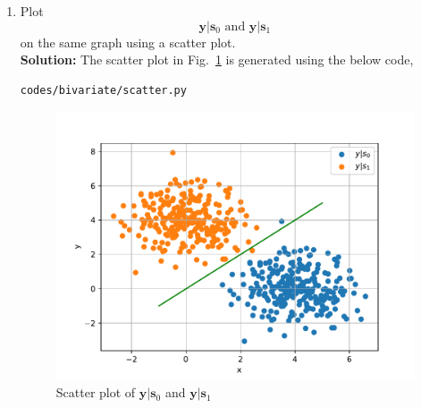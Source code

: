 \documentclass[journal,8pt,onecolumn]{IEEEtran}
\newcommand\figref{Fig.~\ref}
\providecommand{\mbf}{\mathbf}
\newcommand{\solution}{\noindent \textbf{Solution: }}
\begin{document}
\begin{enumerate}
\item
\label{ch5_fsk}
Plot 
%
\begin{equation}
\mbf{y}|\mbf{s}_0 \text{ and } \mbf{y}|\mbf{s}_1
\end{equation}
%
on the same graph using a scatter plot.\\
\solution The scatter plot in \figref{fig:biv_scatter} is generated using the below code,
\begin{lstlisting}
codes/bivariate/scatter.py
\end{lstlisting}
%
\begin{figure}[H]
\centering
\includegraphics[width=\columnwidth/2]{./figs/biv_scatter.pdf}
\caption{Scatter plot of $\mbf{y}|\mbf{s}_0$ and $\mbf{y}|\mbf{s}_1$ }
\label{fig:biv_scatter}
\end{figure}


\end{enumerate}
\end{document}
